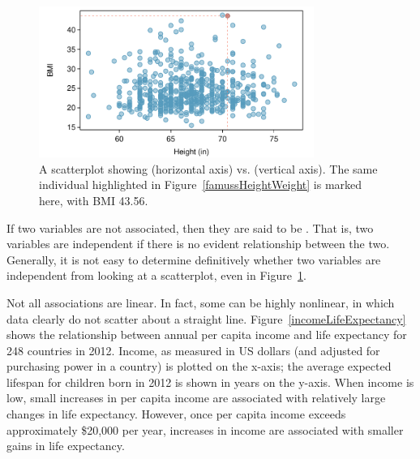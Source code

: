 \begin{figure}[h!]
\centering
\includegraphics[width=0.8\textwidth]
{ch_intro_to_data_oi_biostat/figures/famussHeightBmi/famussHeightBmi.pdf}
\caption{A scatterplot showing  (horizontal axis) vs.   (vertical axis). The same individual highlighted in Figure~\ref{famussHeightWeight} is marked here, with BMI 43.56.} 
\label{famussHeightBmi}
\end{figure}


If two variables are not associated, then they are said to be . That is, two variables are independent if there is no evident relationship between the two.  Generally, it is not easy to determine definitively whether two variables are independent from looking at a scatterplot, even in Figure~\ref{famussHeightBmi}.



Not all associations are linear. In fact, some can be highly nonlinear, in which data clearly do not scatter about a straight line. Figure~\ref{incomeLifeExpectancy} shows the relationship between annual per capita income and life expectancy for 248 countries in 2012. Income, as measured in US dollars (and adjusted for purchasing power in a country) is plotted on the x-axis; the average expected lifespan for children born in 2012 is shown in years on the y-axis. When income is low, small increases in per capita income are associated with relatively large changes in life expectancy. However, once per capita income exceeds approximately \$20,000 per year, increases in income are associated with smaller gains in life expectancy.



